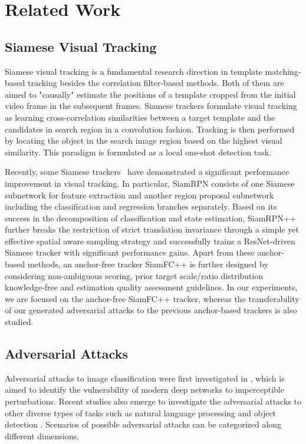\documentclass[journal]{IEEEtran}
\begin{document}
\section{Related Work}

\subsection{Siamese Visual Tracking}

Siamese visual tracking is a fundamental research direction in template matching-based tracking besides the correlation filter-based methods. Both of them are aimed to "causally" estimate the positions of a template cropped from the initial video frame in the subsequent frames. Siamese trackers formulate visual tracking as learning cross-correlation similarities between a target template and the candidates in search region in a convolution fashion. Tracking is then performed by locating the object in the search image region based on the highest visual similarity. This paradigm is formulated as a local one-shot detection task.

Recently, some Siamese trackers~\cite{SiamRPN,SiamRPN++,SiamFC++} have demonstrated a significant performance improvement in visual tracking. 
In particular, SiamRPN \cite{SiamRPN} consists of one Siamese subnetwork for feature extraction and another region proposal subnetwork including the classification and regression branches separately. Based on its success in the decomposition of classification and state estimation, SiamRPN++ \cite{SiamRPN++} further breaks the restriction of strict translation invariance through a simple yet effective spatial aware sampling strategy and successfully trains a ResNet-driven Siamese tracker with significant performance gains. Apart from these anchor-based methods, an anchor-free tracker SiamFC++ \cite{SiamFC++} is further designed by considering non-ambiguous scoring, prior target scale/ratio distribution knowledge-free and estimation quality assessment guidelines.
In our experiments, we are focused on the anchor-free SiamFC++ tracker, whereas the transferability of our generated adversarial attacks to the previous anchor-based trackers is also studied.

\subsection{Adversarial Attacks}

Adversarial attacks to image classification were first investigated in \cite{intriguing}, which is aimed to identify the vulnerability of modern deep networks to imperceptible perturbations. 
Recent studies also emerge to investigate the adversarial attacks to other diverse types of tasks such as natural language processing \cite{generating} and object detection \cite{wei2019transferable}.
Scenarios of possible adversarial attacks can be categorized along different dimensions.
\end{document}
